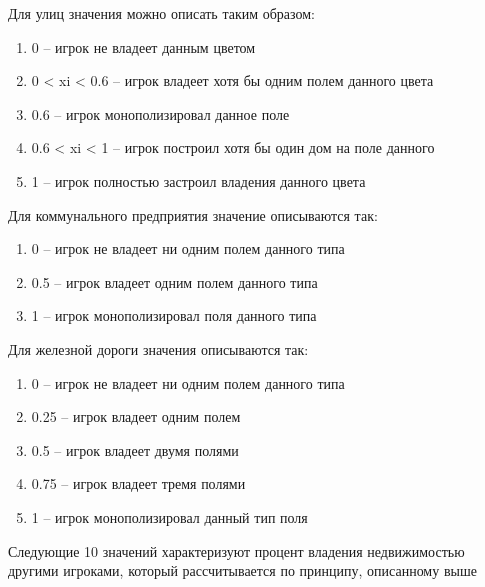 \begin{Large}
Для улиц значения можно описать таким образом:
\begin{spacing}{0.9}
\begin{enumerate}
    \item 0 – игрок не владеет данным цветом
    \item 0 < xi < 0.6 – игрок владеет хотя бы одним полем данного цвета
    \item 0.6 – игрок монополизировал данное поле
    \item 0.6 < xi < 1 – игрок построил хотя бы один дом на поле данного
    \item 1 – игрок полностью застроил владения данного цвета 
\end{enumerate}
\end{spacing}
Для коммунального предприятия значение описываются так:
\begin{spacing}{0.9}
\begin{enumerate}
    \item 0 – игрок не владеет ни одним полем данного типа
    \item 0.5 – игрок владеет одним полем данного типа
    \item 1 – игрок монополизировал поля данного типа
\end{enumerate}
\end{spacing}
Для железной дороги значения описываются так:
\begin{spacing}{0.9}
\begin{enumerate}
    \item 0 – игрок не владеет ни одним полем данного типа
    \item 0.25 – игрок владеет одним полем
    \item 0.5 – игрок владеет двумя полями 
    \item 0.75 – игрок владеет тремя полями
    \item 1 – игрок монополизировал данный тип поля
\end{enumerate}
\end{spacing}
Следующие 10 значений характеризуют процент владения недвижимостью другими игроками, который рассчитывается по принципу, описанному выше


\end{Large}
